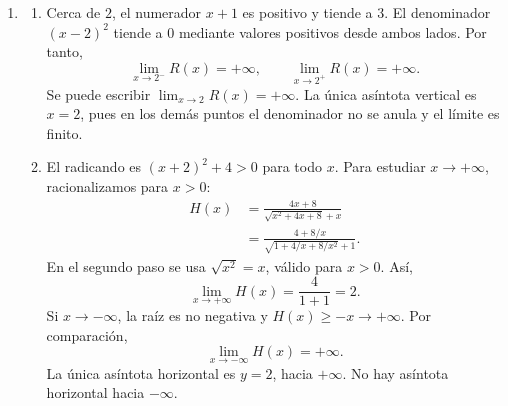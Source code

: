 \documentclass[10pt,a5paper]{article}
\newif\ifmostrarSoluciones
\begin{document}
\ifmostrarSoluciones
\newpage
\begin{solucion}[de la versión 2]
\begin{enumerate}
  \item
  \begin{enumerate}
    \item Cerca de $2$, el numerador $x+1$ es positivo y tiende a $3$. El denominador $(x-2)^2$ tiende a $0$ mediante valores positivos desde ambos lados. Por tanto,
    \[
      \lim_{x\to2^-}R(x)=+\infty,\qquad
      \lim_{x\to2^+}R(x)=+\infty.
    \]
    Se puede escribir $\lim_{x\to2}R(x)=+\infty$. La única asíntota vertical es $x=2$, pues en los demás puntos el denominador no se anula y el límite es finito.
    \item El radicando es $(x+2)^2+4>0$ para todo $x$. Para estudiar $x\to+\infty$, racionalizamos para $x>0$:
    \begin{align*}
      H(x)&=\frac{4x+8}{\sqrt{x^2+4x+8}+x}\\
          &=\frac{4+8/x}{\sqrt{1+4/x+8/x^2}+1}.
    \end{align*}
    En el segundo paso se usa $\sqrt{x^2}=x$, válido para $x>0$. Así,
    \[
      \lim_{x\to+\infty}H(x)=\frac4{1+1}=2.
    \]
    Si $x\to-\infty$, la raíz es no negativa y $H(x)\geq-x\to+\infty$. Por comparación,
    \[
      \lim_{x\to-\infty}H(x)=+\infty.
    \]
    La única asíntota horizontal es $y=2$, hacia $+\infty$. No hay asíntota horizontal hacia $-\infty$.
  \end{enumerate}


\end{enumerate}
\end{solucion}
\end{document}
